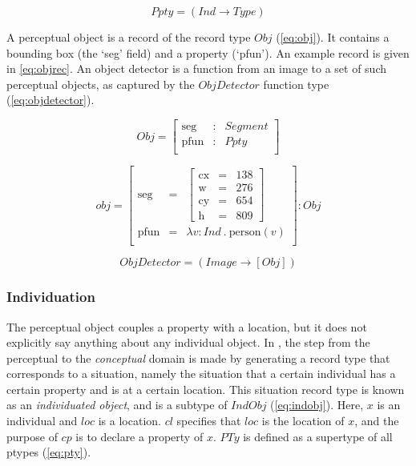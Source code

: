 \begin{equation}\label{eq:ppty}
Ppty = (Ind \rightarrow Type)\end{equation}


A perceptual object is a record of the record type $Obj$ (\autoref{eq:obj}).
It contains a bounding box (the `seg' field) and a property (`pfun').
An example record is given in \autoref{eq:objrec}.
An object detector is a function from an image to a set of such perceptual objects, as captured by the $ObjDetector$ function type (\autoref{eq:objdetector}).


\begin{equation}\label{eq:obj}
Obj = \left[\begin{array}{rcl}
\text{seg} &:& Segment\\
\text{pfun} &:& Ppty \\
\end{array}\right]\end{equation}

\begin{equation}\label{eq:objrec}
obj =
\left[\begin{array}{rcl}
\text{seg} &=& \left[\begin{array}{rcl}
\text{cx} &=& 138\\
\text{w} &=& 276\\
\text{cy} &=& 654\\
\text{h} &=& 809
\end{array}\right]\\
\text{pfun} &=& \lambda v:Ind\ .\ \text{person}(v)\\
\end{array}\right] : Obj\end{equation}

\begin{equation}\label{eq:objdetector}
ObjDetector = ( Image \rightarrow [Obj] )
\end{equation}



\subsubsection{Individuation}

The perceptual object couples a property with a location, but it does not explicitly say anything about any individual object.
In \cite{lspc}, the step from the perceptual to the \textit{conceptual} domain is made by generating a record type that corresponds to a situation, namely the situation that a certain individual has a certain property and is at a certain location.
This situation record type is known as an \textit{individuated object}, and is a subtype of $IndObj$ (\autoref{eq:indobj}).
Here, $x$ is an individual and $loc$ is a location.
$cl$ specifies that $loc$ is the location of $x$, and the purpose of $cp$ is to declare a property of $x$.
$PTy$ is defined as a supertype of all ptypes (\autoref{eq:pty}).

